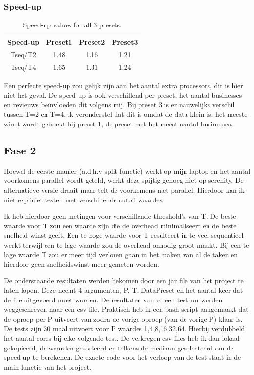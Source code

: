 \documentclass[]{article}
\begin{document}
\subsubsection{Speed-up}
\begin{table}[h!]
	\centering
	\begin{tabular}{|c|c|c|c|}
		\hline 
		Speed-up & Preset1 & Preset2 & Preset3 \\ 
		\hline 
		Tseq/T2 & 1.48 & 1.16 & 1.21 \\ 
		\hline 
		Tseq/T4 & 1.65 & 1.31 & 1.24 \\ 
		\hline 
	\end{tabular} 
	\caption{Speed-up values for all 3 presets.}
	\label{table:2}
\end{table}

Een perfecte speed-up zou gelijk zijn aan het aantal extra processors, dit is hier niet het geval.
De speed-up is ook verschillend per preset, het aantal businesses en revieuws beïnvloeden dit volgens mij.
Bij preset 3 is er nauwelijks verschil tussen T=2 en T=4, ik veronderstel dat dit is omdat de data klein is.
het meeste winst wordt geboekt bij preset 1, de preset met het meest aantal businesses.

\subsection{Fase 2}

Hoewel de eerste manier (a.d.h.v split functie) werkt op mijn laptop en het aantal voorkomens parallel wordt geteld, werkt deze spijtig genoeg niet op serenity. De alternatieve versie draait maar telt de voorkomens niet parallel. Hierdoor kan ik niet expliciet testen met verschillende cutoff waardes.

Ik heb hierdoor geen metingen voor verschillende threshold's van T. De beste waarde voor T zou een waarde zijn die de overhead minimaliseert en de beste snelheid winst geeft. Een te hoge waarde voor T resulteert in te veel sequentieel werkt terwijl een te lage waarde zou de overhead onnodig groot maakt. Bij een te lage waarde T zou er meer tijd verloren gaan in het maken van al de taken en hierdoor geen snelheidswinst meer gemeten worden.

De onderstaande resultaten werden bekomen door een jar file van het project te laten lopen. Deze neemt 4 argumenten, P, T, DataPreset en het aantal keer dat de file uitgevoerd moet worden. De resultaten van zo een testrun worden weggeschreven naar een csv file. Praktisch heb ik een bash script aangemaakt dat de oproep per P uitvoert van zodra de vorige oproep (van de vorige P) klaar is. De tests zijn 30 maal uitvoert voor P waardes 1,4,8,16,32,64. Hierbij verdubbeld het aantal cores bij elke volgende test.
De verkregen csv files heb ik dan lokaal gekopieerd, de waarden gesorteerd en telkens de mediaan geselecteerd om de speed-up te berekenen. De exacte code voor het verloop van de test staat in de main functie van het project. 
\end{document}
